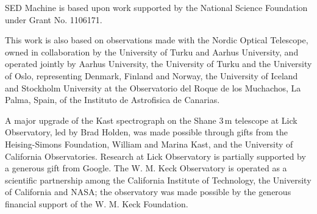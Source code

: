 \documentclass[twocolumn]{aastex631}
\begin{document}
\begin{CJK*}{UTF8}{gbsn}
SED Machine is based upon work supported by the National Science Foundation under Grant No. 1106171.

This work is also based on observations made with the Nordic Optical Telescope, owned in collaboration by the University of Turku and Aarhus University, and operated jointly by Aarhus University, the University of Turku and the University of Oslo, representing Denmark, Finland and Norway, the University of Iceland and Stockholm University at the Observatorio del Roque de los Muchachos, La Palma, Spain, of the Instituto de Astrofisica de Canarias.

A major upgrade of the Kast spectrograph on the Shane 3\,m telescope at Lick Observatory, led by Brad Holden, was made possible through gifts from the Heising-Simons Foundation, William and Marina Kast, and the University of California Observatories. Research at Lick Observatory is partially supported by a generous gift from Google. The W. M. Keck Observatory is operated as a scientific partnership among the California Institute of Technology, the University of California and NASA; the observatory was made possible by the generous financial support of the W. M. Keck Foundation.







\end{CJK*}
\end{document}
